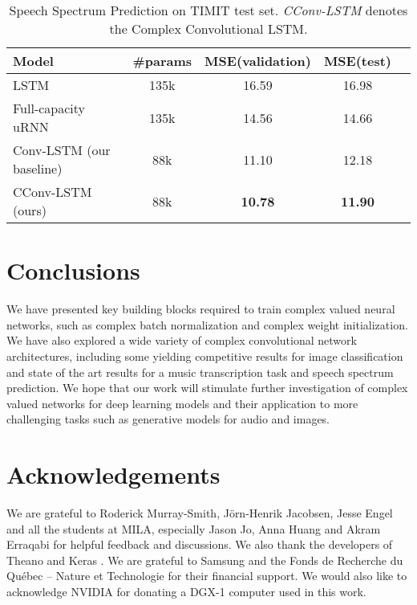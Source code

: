 \documentclass{article}
\begin{document}
\begin{table}[t]
\vskip 0.15in
\begin{center}
\caption{Speech Spectrum Prediction on TIMIT test set. \emph{CConv-LSTM} denotes the Complex Convolutional LSTM.}
\label{tab:TIMIT}
\begin{small}
\begin{sc}
\begin{tabular}{lcccc}
\toprule
Model & \#params & MSE(validation) & MSE(test) \\
\midrule
LSTM \cite{wisdom2016full}&   135k&  16.59& 16.98 \\
Full-capacity uRNN \cite{wisdom2016full} &   135k&  14.56&  14.66\\
Conv-LSTM (our baseline)&   88k&  11.10& 12.18\\
CConv-LSTM (ours) &  88k& \textbf{10.78} & \textbf{11.90}\\
\bottomrule
\end{tabular}
\end{sc}
\end{small}
\end{center}	
\vskip -0.1in
\end{table}

\section{Conclusions}
\label{conclusion}
We have presented key building blocks required to train complex valued neural networks, such as complex batch normalization and complex weight initialization. We have also explored a wide variety of complex convolutional network architectures, including some yielding competitive results for image classification and state of the art results for a music transcription task and speech spectrum prediction. We hope that our work will stimulate further investigation of complex valued networks for deep learning models and their application to more challenging tasks such as generative models for audio and images. 

\section*{Acknowledgements}
We are grateful to Roderick Murray-Smith, Jörn-Henrik Jacobsen, Jesse Engel and all the students at MILA, especially Jason Jo, Anna Huang and Akram Erraqabi for helpful feedback and discussions. We also thank the developers of Theano \citep{2016arXiv160502688short} and Keras \citep{chollet2015keras}. We are grateful to Samsung and the Fonds de Recherche du Québec -- Nature et Technologie for their financial support. We would also like to acknowledge NVIDIA for donating a DGX-1 computer used in this work.
\end{document}
